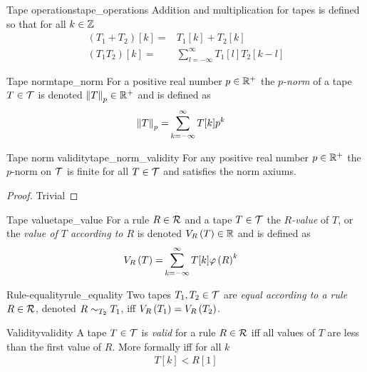 \documentclass[../main.tex]{subfiles}
\begin{document}
\begin{definition}{Tape operations}{tape_operations}
    Addition and multiplication for tapes is defined so that for all $k\in\Z$
    \begin{align*}
        (T_1+T_2)[k]=&T_1[k]+T_2[k]\\
        (T_1 T_2)[k]=&\sum_{l=-\infty}^\infty T_1[l]T_2[k-l]
    \end{align*}
\end{definition}

\begin{definition}{Tape norm}{tape_norm}
    For a positive real number $p\in\R^+$ the \emph{$p$-norm} of a tape $T\in\tapes$ is denoted $\norm pT\in\R^+$ and is defined as
    \begin{align*}
        \norm pT=&\sum_{k=-\infty}^\infty T[k]p^k
    \end{align*}
\end{definition}

\begin{theorem}{Tape norm validity}{tape_norm_validity}
    For any positive real number $p\in\R^+$ the $p$-norm on $\tapes$ is finite for all $T\in\tapes$ and satisfies the norm axiums.   
\end{theorem}
\begin{proof}
    Trivial
\end{proof}

\begin{definition}{Tape value}{tape_value}
    For a rule $R\in\rules$ and a tape $T\in\tapes$ the \emph{$R$-value} of $T$, or the \emph{value of $T$ according to $R$} is denoted $\rvalue{R}{T}\in\R$ and is defined as
    \begin{align*}
        \rvalue{R}{T}=&\sum_{k=-\infty}^\infty T[k]\base{R}^k
    \end{align*}
\end{definition}

\begin{definition}{Rule-equality}{rule_equality}
    Two tapes $T_1,T_2\in\tapes$ are \emph{equal according to a rule} $R\in\rules$, denoted $\requal R{T_1}{T_2}$, iff $\rvalue{R}{T_1}=\rvalue{R}{T_2}$.
\end{definition}

\begin{definition}{Validity}{validity}
    A tape $T\in\tapes$ is \emph{valid} for a rule $R\in\rules$ iff all values of $T$ are less than the first value of $R$.
    More formally iff for all $k$
    \begin{align*}
        T[k]<R[1]
    \end{align*}
\end{definition}
\end{document}
